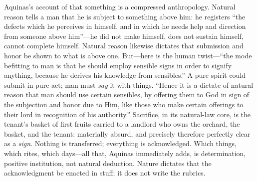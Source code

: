Aquinas's account of that something is a compressed anthropology. Natural reason tells a man that he is subject to something above him: he registers ``the defects which he perceives in himself, and in which he needs help and direction from someone above him''---he did not make himself, does not sustain himself, cannot complete himself. Natural reason likewise dictates that submission and honor be shown to what is above one. But---here is the human twist---``the mode befitting to man is that he should employ sensible signs in order to signify anything, because he derives his knowledge from sensibles.'' A pure spirit could submit in pure act; man must \emph{say} it with things. ``Hence it is a dictate of natural reason that man should use certain sensibles, by offering them to God in sign of the subjection and honor due to Him, like those who make certain offerings to their lord in recognition of his authority.'' Sacrifice, in its natural-law core, is the tenant's basket of first fruits carried to a landlord who owns the orchard, the basket, and the tenant: materially absurd, and precisely therefore perfectly clear as a \emph{sign}. Nothing is transferred; everything is acknowledged. Which things, which rites, which days---all that, Aquinas immediately adds, is determination, positive institution, not natural deduction. Nature dictates that the acknowledgment be enacted in stuff; it does not write the rubrics.

